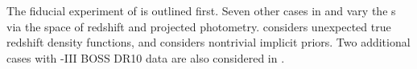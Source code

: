 The fiducial experiment of  is outlined first. 
Seven other cases in  and  vary the \pzpdf s via the space of redshift and projected photometry.
 considers unexpected true redshift density functions, and  considers nontrivial implicit priors.  
Two additional cases with \sdss-III BOSS DR10 data are also considered in .
%

